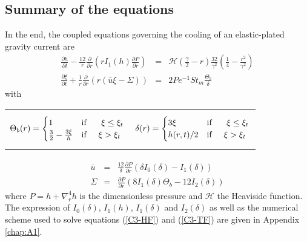\subsection{Summary of the equations}
\label{C3-sec:summary-equations}

In  the  end,  the  coupled  equations governing  the  cooling  of  an
elastic-plated gravity current are
\begin{eqnarray}
  \frac{\partial h}{\partial t}-\frac{12}{r}
  \frac{\partial}{\partial      r}
  \left( r I_1(h) \frac{\partial P}{\partial
  r}\right)
  \label{C3-HF}
  & =& \mathcal{H}(\frac{\gamma}{2}-r)\frac{32}{\gamma^{2}}\left(\frac{1}{4}-\frac{r^{2}}{\gamma^{2}}\right)\\
  \frac{\partial                                       \xi}{\partial
  t}+\frac{1}{r}\frac{\partial}{\partial                          r}
  \left( r\left(\bar{u}\xi-\Sigma\right)\right)&=&2Pe^{-1}St_m\frac{\Theta_b}{\delta}\label{C3-TF}
\end{eqnarray}
with

\begin{tabular}{p{6cm}p{6cm}}
{
\begin{equation}
    \Theta_b(r)=
    \begin{cases}
      1 &\text{if } \hspace{.5cm} \xi\leq \xi_t \nonumber\\
      \frac{3}{2}-\frac{3\xi}{h} & \text{if} \hspace{.5cm} \xi > \xi_t\nonumber
    \end{cases}
  \end{equation}
                                   }
&
{
  \begin{equation}
    \delta(r)=
    \begin{cases}
      3\xi &\text{if } \hspace{.5cm} \xi\leq \xi_t\\
      h(r,t)/2 & \text{if} \hspace{.5cm} \xi > \xi_t\nonumber\\
    \end{cases}
  \end{equation}
  }
\end{tabular}
\begin{eqnarray}
  \overline{u}&=& \frac{12}{\delta}\frac{\partial P}{\partial r}\left(\delta
                  I_0(\delta)-I_1(\delta)\right) \label{C3-ubarF}\\
  \Sigma     &=& \frac{\partial     P}{\partial
                 r}\left(8I_1(\delta)\Theta_b-12I_2(\delta)\right)\label{C3-SigmaF}
\end{eqnarray}
where  $P   =  h+\nabla_r^4h$   is  the  dimensionless   pressure  and
$\mathcal{H}$   the    Heaviside   function.    The    expression   of
$I_0(\delta)$, $I_1(h)$,  $I_1(\delta)$ and  $I_2(\delta)$ as  well as
the  numerical  scheme  used  to  solve  equations  (\ref{C3-HF})  and
(\ref{C3-TF}) are given in Appendix \ref{chap:A1}.

